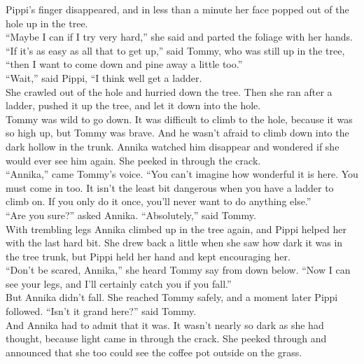 \documentclass{standard}
\begin{document}
Pippi’s finger disappeared, and in less than a minute her face popped out of the hole up in the tree.\\

“Maybe I can if I try very hard,” she said and parted the foliage with her hands.\\

“If it’s as easy as all that to get up,” said Tommy, who was still up in the tree, “then I want to come down and pine away a little too.”\\

“Wait,” said Pippi, “I think well get a ladder.\\

She crawled out of the hole and hurried down the tree. Then she ran after a ladder, pushed it up the tree, and let it down into the hole.\\

Tommy was wild to go down. It was difficult to climb to the hole, because it was so high up, but Tommy was brave. And he wasn’t afraid to climb down into the dark hollow in the trunk. Annika watched him disappear and wondered if she would ever see him again. She peeked in through the crack.\\

“Annika,” came Tommy’s voice. “You can’t imagine how wonderful it is here. You must come in too. It isn’t the least bit dangerous when you have a ladder to climb on. If you only do it once, you’ll never want to do anything else.”\\

“Are you sure?” asked Annika. “Absolutely,” said Tommy.\\

With trembling legs Annika climbed up in the tree again, and Pippi helped her with the last hard bit. She drew back a little when she saw how dark it was in the tree trunk, but Pippi held her hand and kept encouraging her.\\

“Don’t be scared, Annika,” she heard Tommy say from down below. “Now I can see your legs, and I’ll certainly catch you if you fall.”\\

But Annika didn’t fall. She reached Tommy safely, and a moment later Pippi followed.
“Isn’t it grand here?” said Tommy.\\

And Annika had to admit that it was. It wasn’t nearly so dark as she had thought, because light came in through the crack. She peeked through and announced that she too could see the coffee pot outside on the grass.\\
\end{document}
